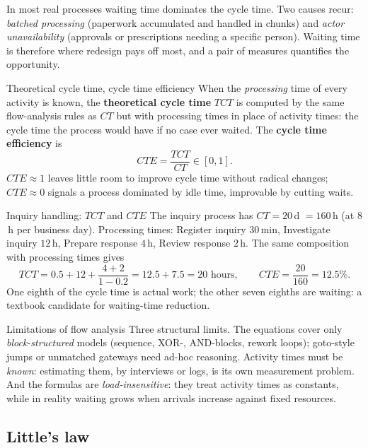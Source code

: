 In most real processes waiting time dominates the cycle time. Two causes recur: \emph{batched processing} (paperwork accumulated and handled in chunks) and \emph{actor unavailability} (approvals or prescriptions needing a specific person). Waiting time is therefore where redesign pays off most, and a pair of measures quantifies the opportunity.
\begin{definitionbox}{Theoretical cycle time, cycle time efficiency}
When the \emph{processing} time of every activity is known, the \textbf{theoretical cycle time} $TCT$ is computed by the same flow-analysis rules as $CT$ but with processing times in place of activity times: the cycle time the process would have if no case ever waited. The \textbf{cycle time efficiency} is
$$CTE = \frac{TCT}{CT} \in [0, 1].$$
$CTE \approx 1$ leaves little room to improve cycle time without radical changes; $CTE \approx 0$ signals a process dominated by idle time, improvable by cutting waits.
\end{definitionbox}
\begin{examplebox}{Inquiry handling: $TCT$ and $CTE$}
The inquiry process has $CT = 20$\,d $= 160$\,h (at $8$\,h per business day). Processing times: Register inquiry $30$\,min, Investigate inquiry $12$\,h, Prepare response $4$\,h, Review response $2$\,h. The same composition with processing times gives
$$TCT = 0.5 + 12 + \frac{4 + 2}{1 - 0.2} = 12.5 + 7.5 = 20 \text{ hours}, \qquad CTE = \frac{20}{160} = 12.5\%.$$
One eighth of the cycle time is actual work; the other seven eighths are waiting: a textbook candidate for waiting-time reduction.
\end{examplebox}

\begin{notebox}{Limitations of flow analysis}
Three structural limits. The equations cover only \emph{block-structured} models (sequence, XOR-, AND-blocks, rework loops); goto-style jumps or unmatched gateways need ad-hoc reasoning. Activity times must be \emph{known}: estimating them, by interviews or logs, is its own measurement problem. And the formulas are \emph{load-insensitive}: they treat activity times as constants, while in reality waiting grows when arrivals increase against fixed resources.
\end{notebox}

\subsection{Little's law}

